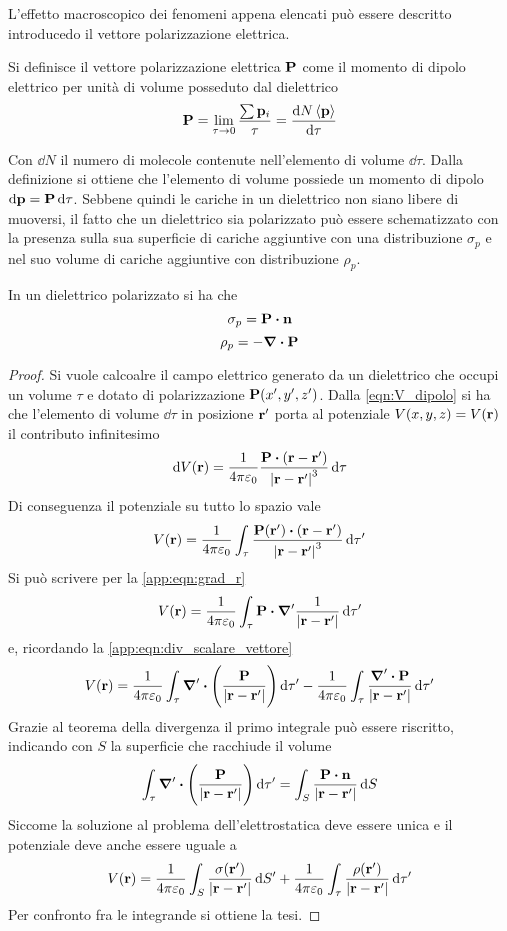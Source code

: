 L'effetto macroscopico dei fenomeni appena elencati può essere descritto introducedo il vettore polarizzazione elettrica.
\begin{defn}
    Si definisce il vettore polarizzazione elettrica $\vb{P}$ come il momento di dipolo elettrico per unità di volume posseduto dal dielettrico
    \[
        \vb{P}=\lim_{\tau\to 0}\frac{\sum \vb{p}_i}{\tau}=\frac{\dd{N}  \expval{\vb{p}}}{\dd{\tau}}
    \]
\end{defn}
Con $\dd{N}$ il numero di molecole contenute nell'elemento di volume $\dd{\tau}$.
Dalla definizione si ottiene che l'elemento di volume possiede un momento di dipolo $\dd{\vb{p}}=\vb{P}\dd{\tau}$.
Sebbene quindi le cariche in un dielettrico non siano libere di muoversi, il fatto che un dielettrico sia polarizzato
può essere schematizzato con la presenza sulla sua superficie di cariche aggiuntive con una distribuzione $\sigma_p$
e nel suo volume di cariche aggiuntive con distribuzione $\rho_p$.
\begin{thm}
    In un dielettrico polarizzato si ha che
    \begin{equation}
        \sigma_p=\vb{P}\vdot\vb{n}
    \end{equation}
    \begin{equation}
        \label{eqn:relazione_rhop_P}
        \rho_p=-\div{\vb{P}}
    \end{equation}
\end{thm}
\begin{proof}
    Si vuole calcoalre il campo elettrico generato da un dielettrico che occupi un volume $\tau$ e dotato di polarizzazione $\vb{P}(x',y',z')$. Dalla \eqref{eqn:V_dipolo} si ha che l'elemento di volume $\dd{\tau}$ in posizione $\vb{r'}$ porta al potenziale $V(x,y,z)=V(\vb{r})$ il contributo infinitesimo
    \[
        \dd{V(\vb{r})}=\rec{4\pi\epsilon_0}\frac{\vb{P}\vdot(\vb{r}-\vb{r'})}{\abs{\vb{r}-\vb{r'}}^3}\dd{\tau}
    \]
    Di conseguenza il potenziale su tutto lo spazio vale
    \[
        V(\vb{r})=\rec{4\pi\epsilon_0}\int_{\tau} \frac{\vb{P}(\vb{r'})\vdot(\vb{r}-\vb{r'})}{\abs{\vb{r}-\vb{r'}}^3}\dd{\tau'}
    \]
    Si può scrivere per la \eqref{app:eqn:grad_r}
    \[
        V(\vb{r})=\rec{4\pi\epsilon_0}\int_{\tau} \vb{P}\vdot \grad'{\rec{\abs{\vb{r}-\vb{r'}}}}\dd{\tau'}
    \]
    e, ricordando la \eqref{app:eqn:div_scalare_vettore}
    \[
        V(\vb{r})=\rec{4\pi\epsilon_0}\int_{\tau} \grad'\vdot{\Biggl(\frac{\vb{P}}{\abs{\vb{r}-\vb{r'}}}\Biggr)}\dd{\tau'}-\rec{4\pi\epsilon_0}\int_{\tau}{\frac{ \grad'\vdot\vb{P}}{\abs{\vb{r}-\vb{r'}}}}\dd{\tau'}
    \]
    Grazie al teorema della divergenza il primo integrale può essere riscritto, indicando con $S$ la superficie che racchiude il volume
    \[
        \int_{\tau} \grad'\vdot{\Biggl(\frac{\vb{P}}{\abs{\vb{r}-\vb{r'}}}\Biggr)}\dd{\tau'}=\int_{S} \frac{\vb{P}\vdot\vb{n}}{\abs{\vb{r}-\vb{r'}}}\dd{S}
    \]
    Siccome la soluzione al problema dell'elettrostatica deve essere unica e il potenziale deve anche essere uguale a
    \[
        V(\vb{r})=\frac{1}{4\pi\varepsilon_0}\int_{S} \frac{\sigma(\vb{r}')}{\abs{\vb{r}-\vb{r'}}}\dd{S'}+\frac{1}{4\pi\varepsilon_0}\int_{\tau}\frac{\rho(\vb{r}')}{\abs{\vb{r}-\vb{r'}}}\dd{\tau'}
    \]
    Per confronto fra le integrande si ottiene la tesi.
\end{proof}
